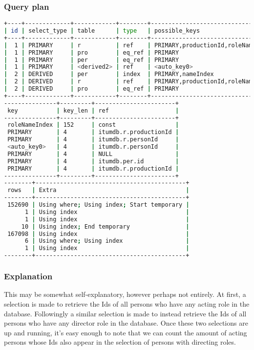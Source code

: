 \subsubsection{Query plan}
\begin{lstlisting}[language=bash]
+----+-------------+------------+--------+------------------------------------+
| id | select_type | table      | type   | possible_keys                      |
+----+-------------+------------+--------+------------------------------------+
|  1 | PRIMARY     | r          | ref    | PRIMARY,productionId,roleNameIndex |
|  1 | PRIMARY     | pro        | eq_ref | PRIMARY                            |
|  1 | PRIMARY     | per        | eq_ref | PRIMARY                            |
|  1 | PRIMARY     | <derived2> | ref    | <auto_key0>                        |
|  2 | DERIVED     | per        | index  | PRIMARY,nameIndex                  |
|  2 | DERIVED     | r          | ref    | PRIMARY,productionId,roleNameIndex |
|  2 | DERIVED     | pro        | eq_ref | PRIMARY                            |
+----+-------------+------------+--------+------------------------------------+
---------------+---------+-----------------------+
 key           | key_len | ref                   |
---------------+---------+-----------------------+
 roleNameIndex | 152     | const                 |
 PRIMARY       | 4       | itumdb.r.productionId |
 PRIMARY       | 4       | itumdb.r.personId     |
 <auto_key0>   | 4       | itumdb.r.personId     |
 PRIMARY       | 4       | NULL                  |
 PRIMARY       | 4       | itumdb.per.id         |
 PRIMARY       | 4       | itumdb.r.productionId |
---------------+---------+-----------------------+
--------+-------------------------------------------+
 rows   | Extra                                     |
--------+-------------------------------------------+
 152690 | Using where; Using index; Start temporary |
      1 | Using index                               |
      1 | Using index                               |
     10 | Using index; End temporary                |
 167098 | Using index                               |
      6 | Using where; Using index                  |
      1 | Using index                               |
--------+-------------------------------------------+

\end{lstlisting}

\subsubsection{Explanation}
This may be somewhat self-explanatory, however perhaps not entirely. At first, a selection is made to retrieve the Ids of all persons who have any acting role in the database. Followingly a similar selection is made to instead retrieve the Ids of all persons who have any director role in the database. Once these two selections are up and running, it's easy enough to note that we can count the amount of acting persons whose Ids also appear in the selection of persons with directing roles. 


